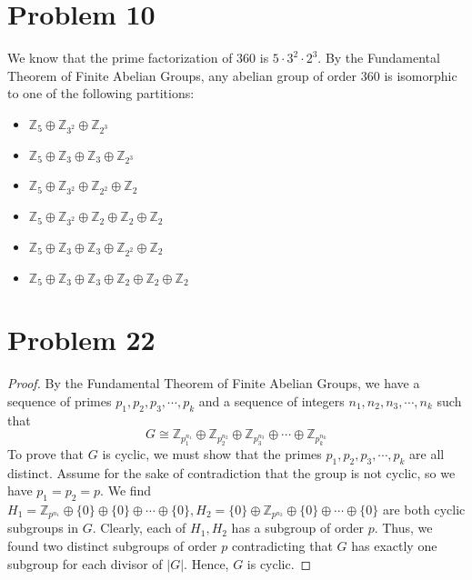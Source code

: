 \documentclass[a4paper,12pt]{article}
\begin{document}
\section*{Problem 10}
We know that the prime factorization of $360$ is $5\cdot 3^2 \cdot 2^3.$ By the Fundamental Theorem of Finite Abelian Groups, any abelian group of order $360$ is isomorphic to one of the following partitions:
\begin{itemize}
    \item $\mathbb{Z}_{5} \oplus \mathbb{Z}_{3^2} \oplus \mathbb{Z}_{2^3}$
    \item $\mathbb{Z}_{5} \oplus \mathbb{Z}_{3} \oplus \mathbb{Z}_3 \oplus \mathbb{Z}_{2^3}$
    \item $\mathbb{Z}_{5} \oplus \mathbb{Z}_{3^2} \oplus \mathbb{Z}_{2^2} \oplus \mathbb{Z}_{2}$
    \item $\mathbb{Z}_{5} \oplus \mathbb{Z}_{3^2} \oplus \mathbb{Z}_{2} \oplus \mathbb{Z}_{2} \oplus \mathbb{Z}_{2}$
    \item $\mathbb{Z}_{5} \oplus \mathbb{Z}_{3} \oplus \mathbb{Z}_{3} \oplus \mathbb{Z}_{2^2} \oplus \mathbb{Z}_{2}$
    \item $\mathbb{Z}_{5} \oplus \mathbb{Z}_{3} \oplus \mathbb{Z}_{3} \oplus \mathbb{Z}_{2} \oplus \mathbb{Z}_{2} \oplus \mathbb{Z}_2$
    

\end{itemize}
\section*{Problem 22}
\begin{proof}
    By the Fundamental Theorem of Finite Abelian Groups, we have a sequence of primes $p_1, p_2, p_3, \cdots , p_k$ and a sequence of integers $n_1, n_2, n_3, \cdots , n_k$ such that
    \[G \cong \mathbb{Z}_{p_1^{n_1}} \oplus \mathbb{Z}_{p_2^{n_2}} \oplus \mathbb{Z}_{p_3^{n_3}} \oplus \cdots \oplus \mathbb{Z}_{p_k^{n_k}}\]
    To prove that $G$ is cyclic, we must show that the primes $p_1, p_2, p_3, \cdots , p_k$ are all distinct. 
    Assume for the sake of contradiction that the group is not cyclic, so we have $p_1=p_2=p.$
    We find $H_1=\mathbb{Z}_{p^{n_1}}\oplus \{0\} \oplus \{0\}\oplus \cdots \oplus \{0\}, H_2= \{0\}\oplus \mathbb{Z}_{p^{n_2}} \oplus \{0\}\oplus \cdots \oplus \{0\}$ are both cyclic subgroups in $G.$ Clearly, each of $H_1, H_2$ has a subgroup of order $p$. Thus, we found two distinct subgroups of order $p$ contradicting that $G$ has exactly one subgroup for each divisor of $|G|.$ Hence, $G$ is cyclic.
\end{proof}
\end{document}
